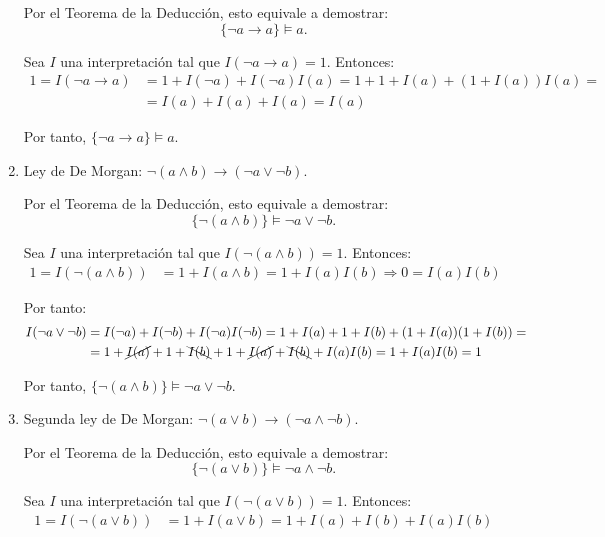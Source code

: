 \begin{ejercicio}
\begin{enumerate}
        Por el Teorema de la Deducción, esto equivale a demostrar:
        \begin{equation*}
            \{\neg a \rightarrow a\} \models a.
        \end{equation*}

        Sea $I$ una interpretación tal que $I(\neg a \rightarrow a) = 1$. Entonces:
        \begin{align*}
            1=I(\neg a \rightarrow a) &= 1+I(\neg a) + I(\neg a)I(a) = 1+1+I(a)+(1+I(a))I(a) =\\&= I(a)+I(a)+I(a)=I(a)
        \end{align*}

        Por tanto, $\{\neg a \rightarrow a\} \models a$.
        \item Ley de De Morgan: $\neg(a\land b) \rightarrow (\neg a \lor \neg b)$.
        
        Por el Teorema de la Deducción, esto equivale a demostrar:
        \begin{equation*}
            \{\neg(a\land b)\} \models \neg a \lor \neg b.
        \end{equation*}

        Sea $I$ una interpretación tal que $I(\neg(a\land b)) = 1$. Entonces:
        \begin{align*}
            1=I(\neg(a\land b)) &= 1+I(a\land b) = 1+I(a)I(b)
            \Longrightarrow
            0=I(a)I(b)
        \end{align*}

        Por tanto:
        \begin{align*}
            I(\neg a \lor \neg b) &= I(\neg a) + I(\neg b) + I(\neg a)I(\neg b) = 1+I(a) + 1+I(b) + (1+I(a))(1+I(b)) =\\&= 1+\cancel{I(a)} + 1+\bcancel{I(b)} + 1+\cancel{I(a)}+\bcancel{I(b)}+I(a)I(b) = 1+I(a)I(b)=1
        \end{align*}

        Por tanto, $\{\neg(a\land b)\} \models \neg a \lor \neg b$.
        \item Segunda ley de De Morgan: $\neg(a\lor b) \rightarrow (\neg a \land \neg b)$.
        
        Por el Teorema de la Deducción, esto equivale a demostrar:
        \begin{equation*}
            \{\neg(a\lor b)\} \models \neg a \land \neg b.
        \end{equation*}

        Sea $I$ una interpretación tal que $I(\neg(a\lor b)) = 1$. Entonces:
        \begin{align*}
            1=I(\neg(a\lor b)) &= 1+I(a\lor b) = 1+I(a) + I(b) + I(a)I(b)
        \end{align*}


\end{enumerate}
\end{ejercicio}
